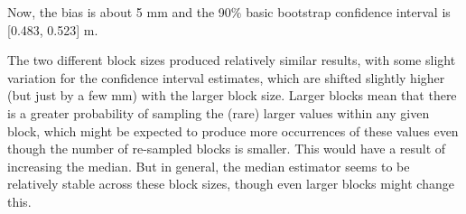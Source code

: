 \documentclass[
  letterpaper,
  DIV=11,
  numbers=noendperiod]{scrartcl}
\begin{document}
Now, the bias is about 5 mm and the 90\% basic bootstrap confidence
interval is {[}0.483, 0.523{]} m.

The two different block sizes produced relatively similar results, with
some slight variation for the confidence interval estimates, which are
shifted slightly higher (but just by a few mm) with the larger block
size. Larger blocks mean that there is a greater probability of sampling
the (rare) larger values within any given block, which might be expected
to produce more occurrences of these values even though the number of
re-sampled blocks is smaller. This would have a result of increasing the
median. But in general, the median estimator seems to be relatively
stable across these block sizes, though even larger blocks might change
this.
\end{document}
